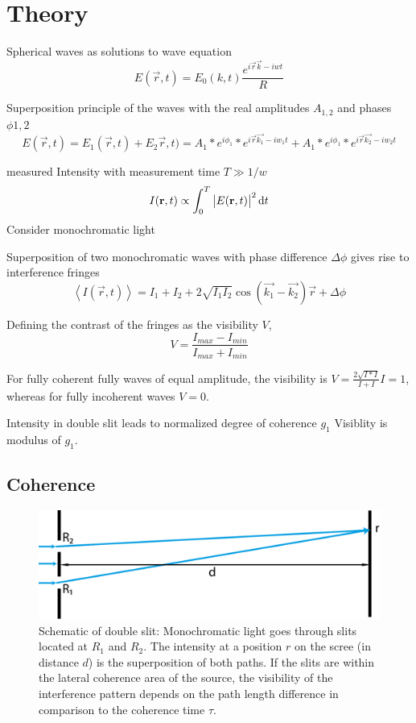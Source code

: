 \chapter{Theory}


Spherical waves as  solutions to wave equation
\begin{equation}
	E(\vec{r},t)=E_0(k,t) \frac{e^{i\vec{r}\vec{k}-iwt}}{R}
	\end{equation}

Superposition principle of the waves with the real amplitudes $A_{1,2}$ and phases $\phi{1,2}$
\begin{equation}
E(\vec{r},t)=E_1(\vec{r},t)+E_2\vec{r},t)=A_1*e^{i\phi_1} * e^{i\vec{r}\vec{k_1}-iw_1t} + A_1*e^{i\phi_1} * e^{i\vec{r}\vec{k_2}-iw_2t} 
\end{equation} 

measured Intensity with measurement time $T\gg1/w$
\begin{equation}
	I(\mathbf{r},t)\propto \int_0^T \left|E(\mathbf{r},t)\right|^2 \operatorname{\mathrm{d}\!} t
\end{equation}
Consider monochromatic light

Superposition of two monochromatic waves with phase difference $\Delta \phi$ gives rise to interference fringes
\begin{equation}
	\left<I(\vec{r},t)\right>=I_1+I_2+2\sqrt{I_1I_2}\cos{(\vec{k_1}-\vec{k_2})\vec{r}+\Delta \phi}
\end{equation}

Defining the contrast of the fringes as the visibility $V$,
\begin{equation}
	V=\frac{I_{max}-I_{min}}{I_{max}+I_{min}}
\end{equation} 

For fully coherent fully waves of equal amplitude, the visibility is $V=\frac{2\sqrt{I*I}}{I+I}I=1$, whereas for fully incoherent waves $V=0$.

Intensity in double slit leads to normalized degree of coherence $g_1$
Visiblity is modulus of $g_1$.


\section{Coherence}
 \begin{figure}
 	\centering
 	\includegraphics[width=0.8\linewidth]{images/doubleslit.pdf}
 	\caption{Schematic of double slit: Monochromatic light goes through slits located at $R_1$ and $R_2$. The intensity at a position $r$ on the scree (in distance $d$) is the superposition of both paths.  If the slits are within the lateral coherence area of the source, the visibility of the interference pattern depends on the path length difference in comparison to the coherence time $\tau$.}
 \end{figure}

